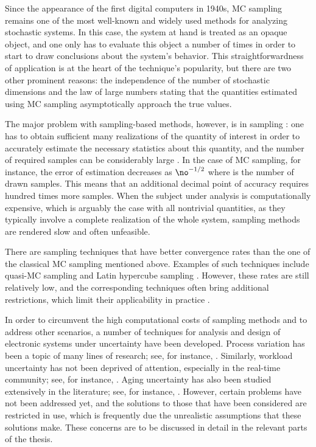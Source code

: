 Since the appearance of the first digital computers in 1940s, \ac{MC} sampling
remains one of the most well-known and widely used methods for analyzing
stochastic systems. In this case, the system at hand is treated as an opaque
object, and one only has to evaluate this object a number of times in order to
start to draw conclusions about the system's behavior. This straightforwardness
of application is at the heart of the technique's popularity, but there are two
other prominent reasons: the independence of the number of stochastic dimensions
and the law of large numbers \cite{durrett2010} stating that the quantities
estimated using \ac{MC} sampling asymptotically approach the true values.

The major problem with sampling-based methods, however, is in sampling \perse:
one has to obtain sufficient many realizations of the quantity of interest in
order to accurately estimate the necessary statistics about this quantity, and
the number of required samples can be considerably large
\cite{diaz-emparanza2002}. In the case of \ac{MC} sampling, for instance, the
error of estimation decreases as $\no^{-1/2}$ where \no is the number of drawn
samples. This means that an additional decimal point of accuracy requires
hundred times more samples. When the subject under analysis is computationally
expensive, which is arguably the case with all nontrivial quantities, as they
typically involve a complete realization of the whole system, sampling methods
are rendered slow and often unfeasible.

There are sampling techniques that have better convergence rates than the one of
the classical \ac{MC} sampling mentioned above. Examples of such techniques
include quasi-\ac{MC} sampling and Latin hypercube sampling \cite{asmussen2007}.
However, these rates are still relatively low, and the corresponding techniques
often bring additional restrictions, which limit their applicability in practice
\cite{xiu2010}.

In order to circumvent the high computational costs of sampling methods and to
address other scenarios, a number of techniques for analysis and design of
electronic systems under uncertainty have been developed. Process variation has
been a topic of many lines of research; see, for instance, \cite{bhardwaj2006,
bhardwaj2008, chandra2010, juan2012, lee2013}. Similarly, workload uncertainty
has not been deprived of attention, especially in the real-time community; see,
for instance, \cite{diaz2002, santinelli2011, quinton2012, tanasa2015}. Aging
uncertainty has also been studied extensively in the literature; see, for
instance, \cite{coskun2006, huang2009b, das2014c}. However, certain problems
have not been addressed yet, and the solutions to those that have been
considered are restricted in use, which is frequently due the unrealistic
assumptions that these solutions make. These concerns are to be discussed in
detail in the relevant parts of the thesis.
